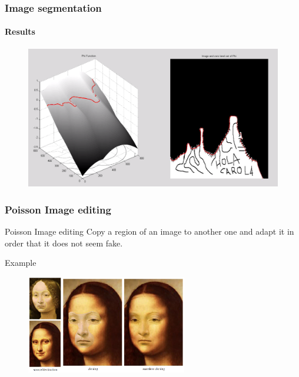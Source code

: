 \documentclass[11pt]{beamer}
\begin{document}
\begin{frame}
\frametitle{Image segmentation}
\framesubtitle{Results}
\begin{figure}
\begin{center}
\includegraphics[scale=0.33]{Segmentation}


\end{center}
\end{figure}




\end{frame}


\begin{frame}
\frametitle{Poisson Image editing}

\begin{block}{Poisson Image editing}
Copy a region of an image to another one and adapt it in order that it does not seem fake.
\end{block}

\begin{exampleblock}{Example}
\begin{figure}
    \centering
    \includegraphics[width=70mm]{Example.png}
\end{figure}
\end{exampleblock}
\end{frame}
\end{document}
